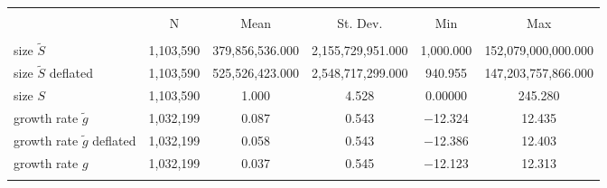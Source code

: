 
\begin{tabular}{@{\extracolsep{5pt}}lccccc} 
\\[-1.8ex]\hline 
\hline \\[-1.8ex] 
 & \multicolumn{1}{c}{N} & \multicolumn{1}{c}{Mean} & \multicolumn{1}{c}{St. Dev.} & \multicolumn{1}{c}{Min} & \multicolumn{1}{c}{Max} \\ 
\hline \\[-1.8ex] 
size $\tilde{S}$ & 1,103,590 & 379,856,536.000 & 2,155,729,951.000 & 1,000.000 & 152,079,000,000.000 \\ 
size $\tilde{S}$ deflated & 1,103,590 & 525,526,423.000 & 2,548,717,299.000 & 940.955 & 147,203,757,866.000 \\ 
size $S$ & 1,103,590 & 1.000 & 4.528 & 0.00000 & 245.280 \\ 
growth rate $\tilde{g}$ & 1,032,199 & 0.087 & 0.543 & $-$12.324 & 12.435 \\ 
growth rate $\tilde{g}$ deflated & 1,032,199 & 0.058 & 0.543 & $-$12.386 & 12.403 \\ 
growth rate $g$ & 1,032,199 & 0.037 & 0.545 & $-$12.123 & 12.313 \\ 
\hline \\[-1.8ex] 
\end{tabular} 
